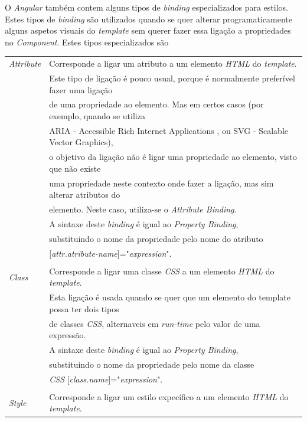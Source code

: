 O \textit{Angular} também contem alguns tipos de \textit{binding} especializados para estilos. Estes tipos de \textit{binding} são utilizados quando se quer alterar programaticamente alguns aspetos visuais do \textit{template} sem querer fazer essa ligação a propriedades no \textit{Component}. Estes tipos especializados são\\

\begin{tabular}{ll}
	\textit{Attribute} & Corresponde a ligar um atributo a um elemento \textit{HTML} do \textit{template}. \\
	&Este tipo de ligação é pouco usual, porque é normalmente preferível fazer uma ligação\\
	& de uma propriedade ao elemento. Mas em certos casos (por exemplo, quando se utiliza \\
	&ARIA - Accessible Rich Internet Applications , ou SVG - Scalable Vector Graphics),\\
	& o objetivo da ligação não é ligar uma propriedade ao elemento, visto que não existe \\
	&uma propriedade neste contexto onde fazer a ligação, mas sim alterar atributos do \\
	&elemento. Neste caso, utiliza-se o \textit{Attribute Binding}. \\
	&A sintaxe deste \textit{binding} é igual ao \textit{Property Binding},\\ &substituindo o nome da propriedade pelo nome do atributo \\
	&[\textit{attr.atribute-name}]="\textit{expression}".\\
	\\
	\textit{Class} & Corresponde a ligar uma classe \textit{CSS} a um elemento \textit{HTML} do \textit{template}. \\
	&Esta ligação é usada quando se quer que um elemento do template possa ter dois tipos \\
	&de classes \textit{CSS}, alternaveis em \textit{run-time} pelo valor de uma expressão. \\
	& A sintaxe deste \textit{binding} é igual ao \textit{Property Binding},\\
	& substituindo o nome da propriedade pelo nome da classe\\
	& \textit{CSS} [\textit{class.name}]="\textit{expression}".\\
	\\
	\textit{Style} & Corresponde a ligar um estilo expecífico a um elemento \textit{HTML} do \textit{template}. \\

\end{tabular}
